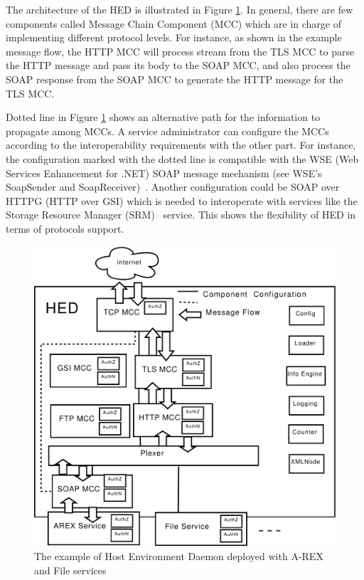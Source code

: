 \documentclass[conference]{IEEEtran}
\begin{document}
The architecture of the HED is illustrated in Figure \ref{fig:HED}. In general, there 
are few components called Message Chain Component (MCC) which are in charge of implementing 
different protocol levels. For instance, as shown in the example message flow, the HTTP MCC 
will process stream from the TLS MCC to parse the HTTP message and pass its body to the SOAP 
MCC, and also process the SOAP response from the SOAP MCC to generate the HTTP message 
for the TLS MCC.

Dotted line in Figure \ref{fig:HED} shows an alternative path for the information 
to propagate among MCCs. A service administrator can configure the MCCs according to the 
interoperability requirements with the other part. For instance, the configuration marked 
with the dotted line is compatible with the WSE (Web Services Enhancement for .NET) SOAP 
message mechanism (see WSE’s SoapSender and SoapReceiver)~\cite{WSElink}. Another configuration 
could be SOAP over HTTPG (HTTP over GSI) which is needed to interoperate with services 
like the Storage Resource Manager (SRM)~\cite{A.Shoshan03} service. This shows the 
flexibility of HED in terms of protocols support.

\begin{figure}
\includegraphics[width=0.9\columnwidth]{HED.pdf}
\caption{The example of Host Environment Daemon deployed with A-REX and File services}
\label{fig:HED}
\end{figure}
\end{document}

